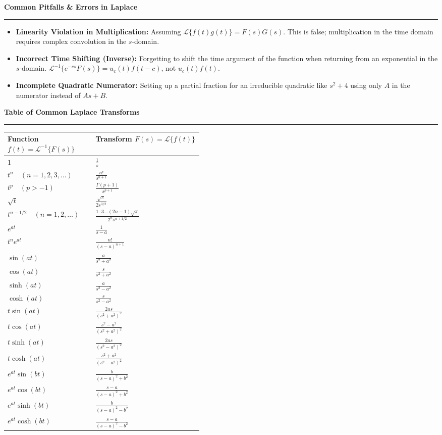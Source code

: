 \documentclass[10pt, landscape, twocolumn]{article}
\newcommand{\cheatsheetsection}[1]{
    \vspace{0.6em}
    {\color{themeblue}\large\bfseries #1} \par
    \vspace{-0.5em}
    {\color{themeblue}\rule{\linewidth}{1pt}} \par
    \vspace{0.2em}
}
\begin{document}
\cheatsheetsection{Common Pitfalls \& Errors in Laplace}
\begin{itemize}[leftmargin=*, nosep]
    \item \textbf{Linearity Violation in Multiplication:} Assuming $\mathcal{L}\{f(t)g(t)\} = F(s)G(s)$. This is false; multiplication in the time domain requires complex convolution in the $s$-domain.
    \item \textbf{Incorrect Time Shifting (Inverse):} Forgetting to shift the time argument of the function when returning from an exponential in the $s$-domain. $\mathcal{L}^{-1}\{e^{-cs}F(s)\} = u_c(t)f(t-c)$, not $u_c(t)f(t)$.
    \item \textbf{Incomplete Quadratic Numerator:} Setting up a partial fraction for an irreducible quadratic like $s^2+4$ using only $A$ in the numerator instead of $As+B$.
\end{itemize}

\clearpage 

\begingroup
\large
\renewcommand{\arraystretch}{1.4}

\cheatsheetsection{Table of Common Laplace Transforms}
\vspace{0.5em}

\begin{tabularx}{\linewidth}{|p{0.45\linewidth}|X|}
\hline
\textbf{Function $f(t) = \mathcal{L}^{-1}\{F(s)\}$} & \textbf{Transform $F(s) = \mathcal{L}\{f(t)\}$} \\ \hline
$1$ & $\frac{1}{s}$ \\ \hline
$t^n \quad (n = 1,2,3,\dots)$ & $\frac{n!}{s^{n+1}}$ \\ \hline
$t^p \quad (p > -1)$ & $\frac{\Gamma(p+1)}{s^{p+1}}$ \\ \hline
$\sqrt{t}$ & $\frac{\sqrt{\pi}}{2s^{3/2}}$ \\ \hline
$t^{n-1/2} \quad (n = 1,2,\dots)$ & $\frac{1 \cdot 3 \dots (2n-1)\sqrt{\pi}}{2^n s^{n+1/2}}$ \\ \hline
$e^{at}$ & $\frac{1}{s-a}$ \\ \hline
$t^n e^{at}$ & $\frac{n!}{(s-a)^{n+1}}$ \\ \hline
$\sin(at)$ & $\frac{a}{s^2+a^2}$ \\ \hline
$\cos(at)$ & $\frac{s}{s^2+a^2}$ \\ \hline
$\sinh(at)$ & $\frac{a}{s^2-a^2}$ \\ \hline
$\cosh(at)$ & $\frac{s}{s^2-a^2}$ \\ \hline
$t \sin(at)$ & $\frac{2as}{(s^2+a^2)^2}$ \\ \hline
$t \cos(at)$ & $\frac{s^2-a^2}{(s^2+a^2)^2}$ \\ \hline
$t \sinh(at)$ & $\frac{2as}{(s^2-a^2)^2}$ \\ \hline
$t \cosh(at)$ & $\frac{s^2+a^2}{(s^2-a^2)^2}$ \\ \hline
$e^{at}\sin(bt)$ & $\frac{b}{(s-a)^2+b^2}$ \\ \hline
$e^{at}\cos(bt)$ & $\frac{s-a}{(s-a)^2+b^2}$ \\ \hline
$e^{at}\sinh(bt)$ & $\frac{b}{(s-a)^2-b^2}$ \\ \hline
$e^{at}\cosh(bt)$ & $\frac{s-a}{(s-a)^2-b^2}$ \\ \hline
\end{tabularx}
\end{document}
